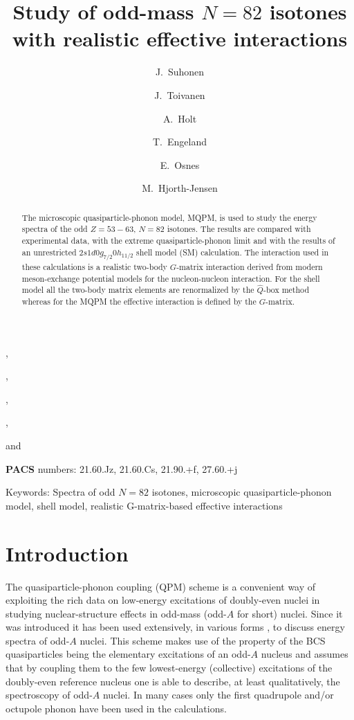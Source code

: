 \begin{frontmatter}

\title{Study of odd-mass $N=82$ isotones with realistic effective 
       interactions}

\author[jyv]{J.\ Suhonen},
\author[jyv]{J.\ Toivanen}, 
\author[oslo]{A.\ Holt}, 
\author[oslo]{T.\ Engeland}, 
\author[oslo]{E.\ Osnes} and
\author[kbh]{M.\ Hjorth-Jensen}
\address[jyv]{Department of Physics, University of Jyv\"{a}skyl\"{a},
              P.O.Box 35, FIN-40351 Jyv\"{a}skyl\"{a}, Finland}
\address[oslo]{Department of Physics, University of Oslo, N-0316 Oslo, Norway}
\address[kbh]{Nordita, Blegdamsvej 17, DK-2100 K\o benhavn \O, Denmark}

\maketitle

\begin{abstract}

The microscopic quasiparticle-phonon model, MQPM, is used to study
the energy spectra of the odd $Z=53 - 63$, $N=82$ isotones. 
The results are compared with experimental data, with the extreme
quasiparticle-phonon limit and with the results of an unrestricted 
$2s1d0g_{7/2}0h_{11/2}$ shell model (SM) calculation.
The interaction used in these calculations is a realistic 
two-body $G$-matrix interaction derived from modern meson-exchange 
potential models for the nucleon-nucleon interaction. 
For the shell model all the 
two-body matrix elements are renormalized by the $\hat{Q}$-box method 
whereas for the MQPM the effective interaction is defined by the $G$-matrix.

\end{abstract}

\end{frontmatter}

{\bf PACS} numbers: 21.60.Jz, 21.60.Cs, 21.90.+f, 27.60.+j

Keywords: Spectra of odd $N=82$ isotones, microscopic quasiparticle-phonon 
model, shell model, realistic G-matrix-based effective interactions

\section{Introduction}\label{sec:sec1}

The quasiparticle-phonon coupling (QPM) scheme is a convenient way of
exploiting the rich data on low-energy excitations of doubly-even nuclei
in studying nuclear-structure effects in odd-mass (odd-$A$ for short)
nuclei. Since it was introduced \cite{KIS63} it has been used extensively,
in various forms \cite{HAL67,DRE71,GUN74,HEL81,MAN90,DIA94,TOI95}, to discuss 
energy spectra of odd-$A$ nuclei. This scheme makes use of the property 
of the BCS quasiparticles being the elementary excitations of an odd-$A$ 
nucleus and assumes that by coupling them to the few lowest-energy (collective)
excitations of the doubly-even reference nucleus one is able to
describe, at least qualitatively, the spectroscopy of odd-$A$ nuclei.
In many cases only the first quadrupole and/or octupole phonon have been
used in the calculations.

